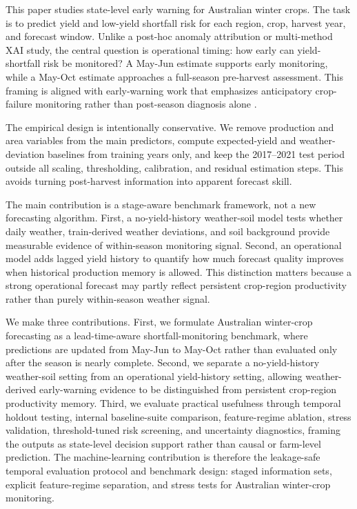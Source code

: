 \documentclass[wcp]{jmlr}
\begin{document}
This paper studies state-level early warning for Australian winter crops. The task is to predict yield and low-yield shortfall risk for each region, crop, harvest year, and forecast window. Unlike a post-hoc anomaly attribution or multi-method XAI study, the central question is operational timing: how early can yield-shortfall risk be monitored? A May-Jun estimate supports early monitoring, while a May-Oct estimate approaches a full-season pre-harvest assessment. This framing is aligned with early-warning work that emphasizes anticipatory crop-failure monitoring rather than post-season diagnosis alone \citep{anderson2024preseasonWarning}.

The empirical design is intentionally conservative. We remove production and area variables from the main predictors, compute expected-yield and weather-deviation baselines from training years only, and keep the 2017--2021 test period outside all scaling, thresholding, calibration, and residual estimation steps. This avoids turning post-harvest information into apparent forecast skill.

The main contribution is a stage-aware benchmark framework, not a new forecasting algorithm. First, a no-yield-history weather-soil model tests whether daily weather, train-derived weather deviations, and soil background provide measurable evidence of within-season monitoring signal. Second, an operational model adds lagged yield history to quantify how much forecast quality improves when historical production memory is allowed. This distinction matters because a strong operational forecast may partly reflect persistent crop-region productivity rather than purely within-season weather signal.

We make three contributions. First, we formulate Australian winter-crop forecasting as a lead-time-aware shortfall-monitoring benchmark, where predictions are updated from May-Jun to May-Oct rather than evaluated only after the season is nearly complete. Second, we separate a no-yield-history weather-soil setting from an operational yield-history setting, allowing weather-derived early-warning evidence to be distinguished from persistent crop-region productivity memory. Third, we evaluate practical usefulness through temporal holdout testing, internal baseline-suite comparison, feature-regime ablation, stress validation, threshold-tuned risk screening, and uncertainty diagnostics, framing the outputs as state-level decision support rather than causal or farm-level prediction. The machine-learning contribution is therefore the leakage-safe temporal evaluation protocol and benchmark design: staged information sets, explicit feature-regime separation, and stress tests for Australian winter-crop monitoring.
\end{document}
